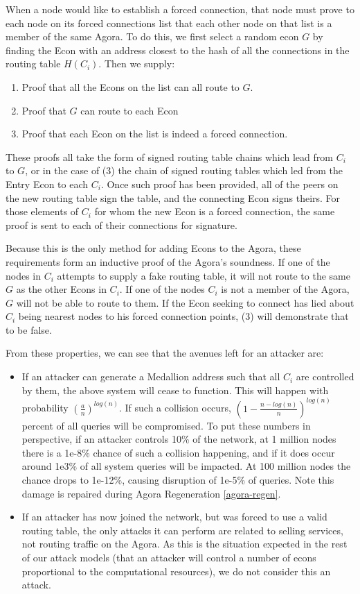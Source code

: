 \documentclass{article}
\begin{document}
When a node would like to establish a forced connection, that node must prove to each node on its forced connections list that each other node on that list is a member of the same Agora. To do this, we first select a random econ $G$ by finding the Econ with an address closest to the hash of all the connections in the routing table $H(C_i)$. Then we supply:

\begin{enumerate}
\item Proof that all the Econs on the list can all route to $G$.
\item Proof that $G$ can route to each Econ
\item Proof that each Econ on the list is indeed a forced connection.
\end{enumerate}

These proofs all take the form of signed routing table chains which lead from $C_i$ to $G$, or in the case of (3) the chain of signed routing tables which led from the Entry Econ to each $C_i$. Once such proof has been provided, all of the peers on the new routing table sign the table, and the connecting Econ signs theirs. For those elements of $C_i$ for whom the new Econ is a forced connection, the same proof is sent to each of their connections for signature.

Because this is the only method for adding Econs to the Agora, these requirements form an inductive proof of the Agora's soundness. If one of the nodes in $C_i$ attempts to supply a fake routing table, it will not route to the same $G$ as the other Econs in $C_i$. If one of the nodes $C_i$ is not a member of the Agora, $G$ will not be able to route to them. If the Econ seeking to connect has lied about $C_i$ being nearest nodes to his forced connection points, (3) will demonstrate that to be false.

From these properties, we can see that the avenues left for an attacker are:

\begin{itemize}
\item If an attacker can generate a Medallion address such that all $C_i$ are controlled by them, the above system will cease to function. This will happen with probability $(\frac{a}{n})^{log(n)}$. If such a collision occurs, $(1 - \frac{n-log(n)}{n})^{log(n)}$ percent of all queries will be compromised. To put these numbers in perspective, if an attacker controls 10\% of the network, at 1 million nodes there is a 1e-8\% chance of such a collision happening, and if it does occur around 1e3\% of all system queries will be impacted. At 100 million nodes the chance drops to 1e-12\%, causing disruption of 1e-5\% of queries. Note this damage is repaired during Agora Regeneration \ref{agora-regen}.
\item If an attacker has now joined the network, but was forced to use a valid routing table, the only attacks it can perform are related to selling services, not routing traffic on the Agora. As this is the situation expected in the rest of our attack models (that an attacker will control a number of econs proportional to the computational resources), we do not consider this an attack.
\end{itemize}
\end{document}
